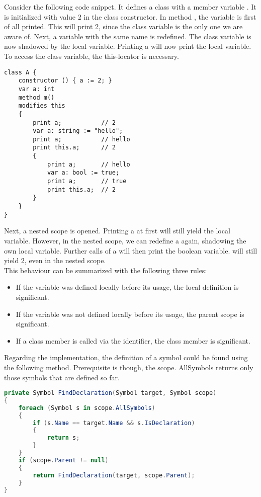 Consider the following code snippet.
It defines a class with a member variable .
It is initialized with value 2 in the class constructor.
In method , the variable  is first of all printed.
This will print 2, since the class variable is the only one we are aware of.
Next, a variable with the same name is redefined.
The class variable is now shadowed by the local variable.
Printing a will now print the local variable.
To access the class variable, the this-locator is necessary.

\begin{lstlisting}[language = dafny, caption={Complex Shadowing Example}, captionpos=b, label={lst:shadowing}]
class A {
    constructor () { a := 2; }
    var a: int
    method m()
    modifies this
    {
        print a;           // 2
        var a: string := "hello";
        print a;           // hello
        print this.a;      // 2
        {
            print a;       // hello
            var a: bool := true;
            print a;       // true
            print this.a;  // 2
        }
    }
}
\end{lstlisting}

Next, a nested scope is opened.
Printing a at first will still yield the local variable.
However, in the nested scope, we can redefine a again, shadowing the own local variable.
Further calls of a will then print the boolean variable.
 will still yield 2, even in the nested scope.\\

This behaviour can be summarized with the following three rules:
\begin{itemize}
    \item If the variable was defined locally before its usage, the local definition is significant.
    \item If the variable was not defined locally before its usage, the parent scope is significant.
    \item If a class member is called via the  identifier, the class member is significant.
\end{itemize}

Regarding the implementation, the definition of a symbol could be found using the following method.
Prerequisite is though, the scope.
AllSymbols returns only those symbols that are defined so far.


\begin{lstlisting}[language=csharp, caption={Finding Symbol Definition}, captionpos=b, label={lst:findsymbol}]
private Symbol FindDeclaration(Symbol target, Symbol scope)
{
    foreach (Symbol s in scope.AllSymbols)
    {
        if (s.Name == target.Name && s.IsDeclaration)
        {
            return s;
        }
    }
    if (scope.Parent != null)
    {
        return FindDeclaration(target, scope.Parent);
    }
}
\end{lstlisting}

